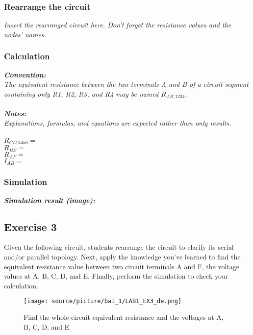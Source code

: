 \subsubsection{Rearrange the circuit}
\textit{Insert the rearranged circuit here. Don't forget the resistance values and the nodes' names.}
\newpage

\subsubsection{Calculation}
\textit{\textbf{Convention:}}\\
\textit{The equivalent resistance between the two terminals A and B of a circuit segment containing only R1, R2, R3, and R4 may be named $R_{AB\_1234}$.}\\
\\
\textit{\textbf{Notes:}}\\
\textit{Explanations, formulas, and equations are expected rather than only results.}\\
\\
$R_{CD\_3456} = $\dotfill\bigskip\\
$R_{BE} = $\dotfill\bigskip\\
$R_{AF} = $\dotfill\bigskip\\
$I_{AB} = $\dotfill\bigskip\\

\subsubsection{Simulation}
\textit{\textbf{Simulation result (image):}}
\newpage

\subsection{Exercise 3}
Given the following circuit, students rearrange the circuit to clarify its serial and/or parallel topology. Next, apply the knowledge you've learned to find the equivalent resistance value between two circuit terminals A and F, the voltage values at A, B, C, D, and E. Finally, perform the simulation to check your calculation.

\begin{figure}[H]
    \centering
    \texttt{[image: source/picture/bai\_1/LAB1\_EX3\_de.png]}
    \caption{Find the whole-circuit equivalent resistance and the voltages at A, B, C, D, and E}
    \label{lab1_ex3_de}
\end{figure}

